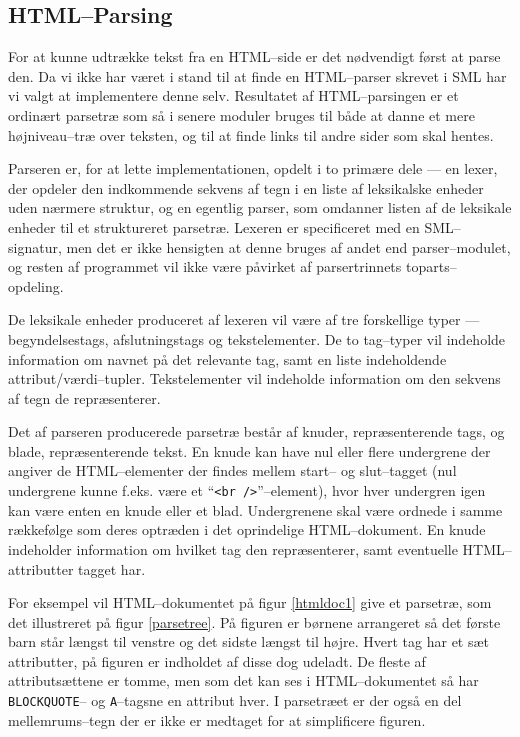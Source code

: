 \documentclass[a4paper,oneside]{memoir}
\begin{document}
\subsection{HTML--Parsing}
\label{htmlparsing}
For at kunne udtrække tekst fra en HTML--side er det nødvendigt først
at parse den. Da vi ikke har været i stand til at finde en HTML--parser
skrevet i SML har vi valgt at implementere denne selv. Resultatet af
HTML--parsingen er et ordinært parsetræ som så i senere moduler bruges
til både at danne et mere højniveau--træ over teksten, og til at finde
links til andre sider som skal hentes.

Parseren er, for at lette implementationen, opdelt i to primære dele ---
en lexer, der opdeler den indkommende sekvens af tegn i en liste af
leksikalske enheder uden nærmere struktur, og en egentlig parser, som
omdanner listen af de leksikale enheder til et struktureret
parsetræ. Lexeren er specificeret med en SML--signatur, men det er ikke
hensigten at denne bruges af andet end parser--modulet, og resten af
programmet vil ikke være påvirket af parsertrinnets toparts--opdeling.

De leksikale enheder produceret af lexeren vil være af tre forskellige
typer --- begyndelsestags, afslutningstags og tekstelementer. De to
tag--typer vil indeholde information om navnet på det relevante tag,
samt en liste indeholdende attribut/værdi--tupler. Tekstelementer vil
indeholde information om den sekvens af tegn de repræsenterer.

Det af parseren producerede parsetræ består af knuder, repræsenterende
tags, og blade, repræsenterende tekst. En knude kan have nul eller
flere undergrene der angiver de HTML--elementer der findes mellem
start-- og slut--tagget (nul undergrene kunne f.eks. være et
``\texttt{<br />}''--element), hvor hver undergren igen kan være enten
en knude eller et blad. Undergrenene skal være ordnede i samme
rækkefølge som deres optræden i det oprindelige HTML--dokument. En
knude indeholder information om hvilket tag den repræsenterer, samt
eventuelle HTML--attributter tagget har.

For eksempel vil HTML--dokumentet på figur \ref{htmldoc1} give et
parsetræ, som det illustreret på figur \ref{parsetree}. På figuren er
børnene arrangeret så det første barn står længst til venstre og det
sidste længst til højre. Hvert tag har et sæt attributter, på figuren
er indholdet af disse dog udeladt. De fleste af attributsættene er
tomme, men som det kan ses i HTML--dokumentet så har
\texttt{BLOCKQUOTE}-- og \texttt{A}--tagsne en attribut hver.
I parsetræet er der også en del mellemrums--tegn der er ikke er
medtaget for at simplificere figuren.
\end{document}
